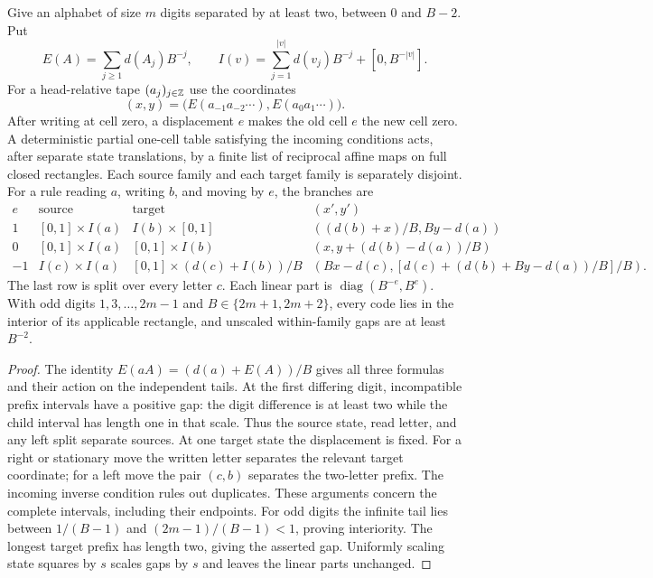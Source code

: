 \begin{lemma}
\label{lem:bb-onecell}\label{lem:bb-mid-prefix}
Give an alphabet of size $m$ digits separated by at least two, between
$0$ and $B-2$.  Put
\[
E(A)=\sum_{j\ge1}d(A_j)B^{-j},\qquad
I(v)=\sum_{j=1}^{|v|}d(v_j)B^{-j}+[0,B^{-|v|}].
\]
For a head-relative tape $(a_j)_{j\in\mathbb Z}$ use the coordinates
\[
 (x,y)=\big(E(a_{-1}a_{-2}\cdots),E(a_0a_1\cdots)\big).
\]
After writing at cell zero, a displacement $e$ makes the old cell $e$
the new cell zero.
A deterministic partial one-cell table satisfying the incoming
conditions acts, after separate state translations, by a finite list
of reciprocal affine maps on full closed rectangles.  Each source
family and each target family is separately disjoint.  For a rule
reading $a$, writing $b$, and moving by $e$, the branches are
\begin{equation}\label{eq:bb-one-cell-branches}
\begin{array}{c|c|c|c}
e&\text{source}&\text{target}&(x',y')\\\hline
1 &[0,1]\times I(a)&I(b)\times[0,1]
 &((d(b)+x)/B,By-d(a))\\
0 &[0,1]\times I(a)&[0,1]\times I(b)
 &(x,y+(d(b)-d(a))/B)\\
-1&I(c)\times I(a)&[0,1]\times(d(c)+I(b))/B
 &(Bx-d(c),[d(c)+(d(b)+By-d(a))/B]/B).
\end{array}
\end{equation}
The last row is split over every letter $c$.  Each linear part is
$\operatorname{diag}(B^{-e},B^e)$.  With odd digits
$1,3,\ldots,2m-1$ and $B\in\{2m+1,2m+2\}$, every code lies in
the interior of its applicable rectangle, and unscaled within-family
gaps are at least $B^{-2}$.
\end{lemma}
\begin{proof}
The identity $E(aA)=(d(a)+E(A))/B$ gives all three formulas and their
action on the independent tails.  At the first differing digit,
incompatible prefix intervals have a positive gap: the digit difference
is at least two while the child interval has length one in that scale.
Thus the source state, read letter, and any left split separate sources.
At one target state the displacement is fixed.  For a right or stationary
move the written letter separates the relevant target coordinate;
for a left move the pair $(c,b)$ separates the two-letter prefix.
The incoming inverse condition rules out duplicates.  These arguments
concern the complete intervals, including their endpoints.
For odd digits the infinite tail lies between $1/(B-1)$ and
$(2m-1)/(B-1)<1$, proving interiority.  The longest target prefix has
length two, giving the asserted gap.  Uniformly scaling state squares
by $s$ scales gaps by $s$ and leaves the linear parts unchanged.
\end{proof}

